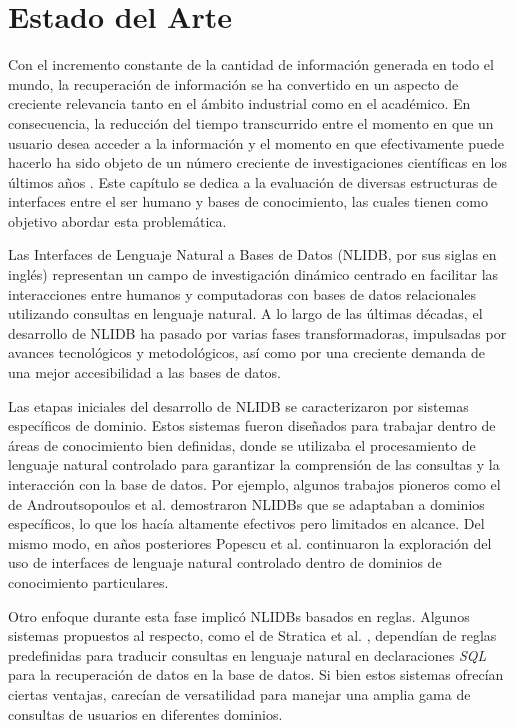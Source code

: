 \chapter{Estado del Arte}\label{chapter: sota}

Con el incremento constante de la cantidad de información generada en todo el mundo, la recuperación de información se ha convertido en un aspecto de creciente relevancia tanto en el ámbito industrial como en el académico. En consecuencia, la reducción del tiempo transcurrido entre el momento en que un usuario desea acceder a la información y el momento en que efectivamente puede hacerlo ha sido objeto de un número creciente de investigaciones científicas en los últimos años \cite{text2sql1} \cite{text2cypher1}. Este capítulo se dedica a la evaluación de diversas estructuras de interfaces entre el ser humano y bases de conocimiento, las cuales tienen como objetivo abordar esta problemática.

Las Interfaces de Lenguaje Natural a Bases de Datos (NLIDB, por sus siglas en inglés) \cite{nlidb} representan un campo de investigación dinámico centrado en facilitar las interacciones entre humanos y computadoras con bases de datos relacionales utilizando consultas en lenguaje natural. A lo largo de las últimas décadas, el desarrollo de NLIDB ha pasado por varias fases transformadoras, impulsadas por avances tecnológicos y metodológicos, así como por una creciente demanda de una mejor accesibilidad a las bases de datos.

Las etapas iniciales del desarrollo de NLIDB se caracterizaron por sistemas específicos de dominio. Estos sistemas fueron diseñados para trabajar dentro de áreas de conocimiento bien definidas, donde se utilizaba el procesamiento de lenguaje natural controlado para garantizar la comprensión de las consultas y la interacción con la base de datos. Por ejemplo, algunos trabajos pioneros como el de Androutsopoulos et al. \cite{androutsopoulos1995natural} demostraron NLIDBs que se adaptaban a dominios específicos, lo que los hacía altamente efectivos pero limitados en alcance. Del mismo modo, en años posteriores Popescu et al. \cite{popescuetal2003} continuaron la exploración del uso de interfaces de lenguaje natural controlado dentro de dominios de conocimiento particulares.

Otro enfoque durante esta fase implicó NLIDBs basados en reglas. Algunos sistemas propuestos al respecto, como el de Stratica et al. \cite{straticaetal2005}, dependían de reglas predefinidas para traducir consultas en lenguaje natural en declaraciones \textit{SQL} para la recuperación de datos en la base de datos. Si bien estos sistemas ofrecían ciertas ventajas, carecían de versatilidad para manejar una amplia gama de consultas de usuarios en diferentes dominios.

